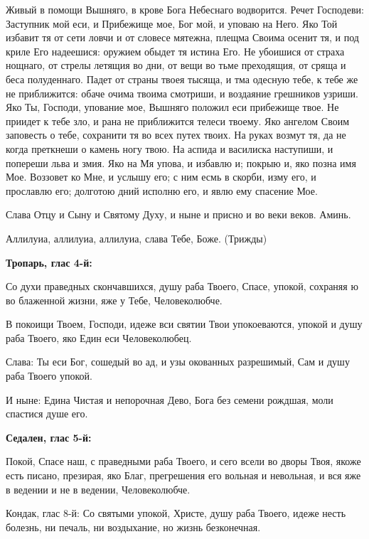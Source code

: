 Живый в помощи Вышняго, в крове Бога Небеснаго водворится. Речет Господеви: Заступник мой еси, и Прибежище мое, Бог мой, и уповаю на Него. Яко Той избавит тя от сети ловчи и от словесе мятежна, плещма Своима осенит тя, и под криле Его надеешися: оружием обыдет тя истина Его. Не убоишися от страха нощнаго, от стрелы летящия во дни, от вещи во тьме преходящия, от сряща и беса полуденнаго. Падет от страны твоея тысяща, и тма одесную тебе, к тебе же не приближится: обаче очима твоима смотриши, и воздаяние грешников узриши. Яко Ты, Господи, упование мое, Вышняго положил еси прибежище твое. Не приидет к тебе зло, и рана не приближится телеси твоему. Яко ангелом Своим заповесть о тебе, сохранити тя во всех путех твоих. На руках возмут тя, да не когда преткнеши о камень ногу твою. На аспида и василиска наступиши, и попереши льва и змия. Яко на Мя упова, и избавлю и; покрыю и, яко позна имя Мое. Воззовет ко Мне, и услышу его; с ним есмь в скорби, изму его, и прославлю его; долготою дний исполню его, и явлю ему спасение Мое. 

Слава Отцу и Сыну и Святому Духу, и ныне и присно и во веки веков. Аминь. 

Аллилуиа, аллилуиа, аллилуиа, слава Тебе, Боже. (Трижды)


\medskip


\bfseries Тропарь, глас 4-й:\normalfont{}


Со духи праведных скончавшихся, душу раба Твоего, Спасе, упокой, сохраняя ю во блаженной жизни, яже у Тебе, Человеколюбче. 

В покоищи Твоем, Господи, идеже вси святии Твои упокоеваются, упокой и душу раба Твоего, яко Един еси Человеколюбец. 

Слава: Ты еси Бог, сошедый во ад, и узы окованных разрешимый, Сам и душу раба Твоего упокой. 

И ныне: Едина Чистая и непорочная Дево, Бога без семени рождшая, моли спастися душе его.


\medskip


\bfseries Седален, глас 5-й:\normalfont{}


Покой, Спасе наш, с праведными раба Твоего, и сего всели во дворы Твоя, якоже есть писано, презирая, яко Благ, прегрешения его вольная и невольная, и вся яже в ведении и не в ведении, Человеколюбче. 

Кондак, глас 8-й: Со святыми упокой, Христе, душу раба Твоего, идеже несть болезнь, ни печаль, ни воздыхание, но жизнь безконечная.


\medskip


